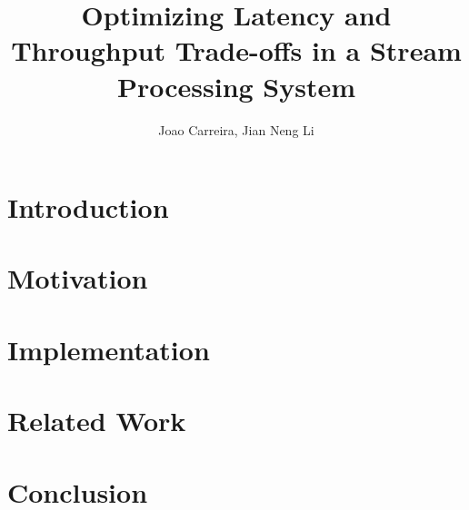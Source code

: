 \documentclass[10pt,twocolumn]{article}
\begin{document}
\title{{\bf Optimizing Latency and Throughput Trade-offs in a Stream Processing System}}
\author[1]{{Joao Carreira, Jian Neng Li}}
\date{}
\maketitle

%

\section{Introduction}


\section{Motivation}



\section{Implementation}


\section{Related Work}


\section{Conclusion}




\end{document}

